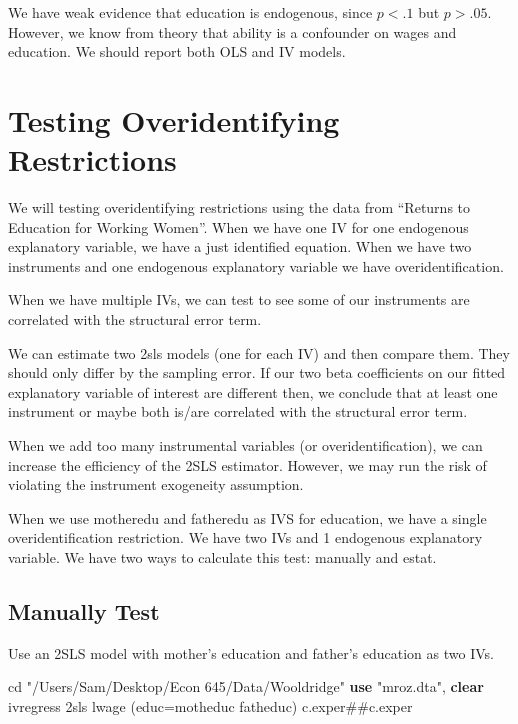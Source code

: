 \documentclass[
]{book}
\newenvironment{Shaded}{\begin{snugshade}}{\end{snugshade}}
\newcommand{\KeywordTok}[1]{\textcolor[rgb]{0.13,0.29,0.53}{\textbf{#1}}}
\newcommand{\NormalTok}[1]{#1}
\newcommand{\StringTok}[1]{\textcolor[rgb]{0.31,0.60,0.02}{#1}}
\begin{document}
We have weak evidence that education is endogenous, since \(p<.1\) but \(p >.05\). However, we know from theory that ability is a confounder on wages and education. We should report both OLS and IV models.

\section{Testing Overidentifying Restrictions}\label{testing-overidentifying-restrictions}

We will testing overidentifying restrictions using the data from ``Returns to Education for Working Women''. When we have one IV for one endogenous explanatory variable, we have a just identified equation. When we have two instruments and one endogenous
explanatory variable we have overidentification.

When we have multiple IVs, we can test to see some of our instruments are correlated with the structural error term.

We can estimate two 2sls models (one for each IV) and then compare them. They should only differ by the sampling error. If our two beta coefficients on our fitted explanatory variable of interest are different then, we conclude that at least one instrument or maybe both is/are correlated with the structural error term.

When we add too many instrumental variables (or overidentification), we can increase the efficiency of the 2SLS estimator. However, we may run the risk of violating the instrument exogeneity assumption.

When we use motheredu and fatheredu as IVS for education, we have a single overidentification restriction. We have two IVs and 1 endogenous explanatory variable. We have two ways to calculate this test: manually and estat.

\subsection{Manually Test}\label{manually-test-1}

Use an 2SLS model with mother's education and father's education as two IVs.

\begin{Shaded}
\begin{Highlighting}[]
\NormalTok{cd }\StringTok{"/Users/Sam/Desktop/Econ 645/Data/Wooldridge"}
\KeywordTok{use} \StringTok{"mroz.dta"}\NormalTok{, }\KeywordTok{clear}
\NormalTok{ivregress 2sls lwage (educ=motheduc fatheduc) c.exper\#\#c.exper}
\end{Highlighting}
\end{Shaded}
\end{document}

